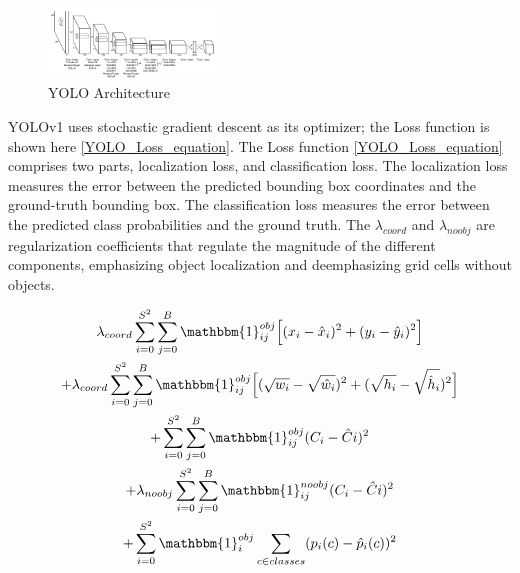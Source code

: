 \documentclass[10pt,twocolumn,letterpaper]{article}
\begin{document}
\begin{figure}[h]
    \centering
    \includegraphics[width=0.4\textwidth]{figures/YOLOv1 Architecture.png}
    \caption{YOLO Architecture \cite{YOLO_OG}}
    \label{fig:YOLOv1Architecture}
\end{figure}


YOLOv1 uses stochastic gradient descent as its optimizer; the Loss function is shown here \ref{YOLO_Loss_equation}. The Loss function \ref{YOLO_Loss_equation} comprises two parts, localization loss, and classification loss. The localization loss measures the error between the predicted bounding box coordinates and the ground-truth bounding box. The classification loss measures the error between the predicted class probabilities and the ground truth. The $\lambda_{coord}$ and $\lambda_{noobj}$ are regularization coefficients that regulate the magnitude of the different components, emphasizing object localization and deemphasizing grid cells without objects. 

\begin{multline} \label{YOLO_Loss_equation}
\lambda_{coord}\sum_{i=0}^{S^2}\sum_{j=0}^{B}\mathbbm{1}_{ij}^{obj}\Big[(x_i-\hat{x}_i)^2+(y_i-\hat{y}_i)^2\Big] \\ + \lambda_{coord}\sum_{i=0}^{S^2}\sum_{j=0}^{B}\mathbbm{1}_{ij}^{obj}\Big[(\sqrt{w_i}-\sqrt{\hat{w}_i})^2+(\sqrt{h_i}-\sqrt{\hat{h}_i})^2\Big]\\
+\sum_{i=0}^{S^2}\sum_{j=0}^{B}\mathbbm{1}_{ij}^{obj}(C_i-\hat{C}i)^2\\
+\lambda_{noobj}\sum_{i=0}^{S^2}\sum_{j=0}^{B}\mathbbm{1}_{ij}^{noobj}(C_i-\hat{C}i)^2\\
+\sum_{i=0}^{S^2}\mathbbm{1}_{i}^{obj}\sum_{c\in classes}(p_i(c)-\hat{p}_i(c))^2
\end{multline}
\end{document}
